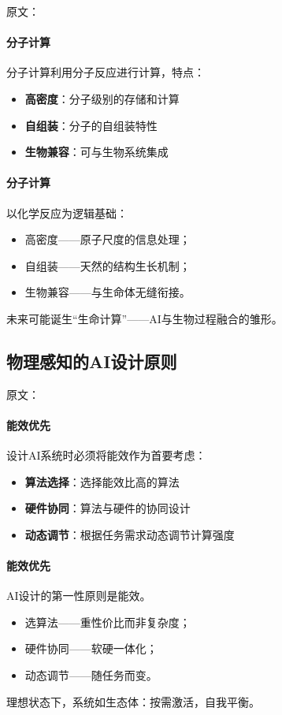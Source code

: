 原文：
\paragraph{分子计算}
分子计算利用分子反应进行计算，特点：
\begin{itemize}
\item \textbf{高密度}：分子级别的存储和计算
\item \textbf{自组装}：分子的自组装特性
\item \textbf{生物兼容}：可与生物系统集成
\end{itemize}
\paragraph{分子计算}
以化学反应为逻辑基础：
\begin{itemize}
\item 高密度——原子尺度的信息处理；
\item 自组装——天然的结构生长机制；
\item 生物兼容——与生命体无缝衔接。
\end{itemize}
未来可能诞生“生命计算”——AI与生物过程融合的雏形。

\subsection{物理感知的AI设计原则}

原文：
\paragraph{能效优先}
设计AI系统时必须将能效作为首要考虑：
\begin{itemize}
\item \textbf{算法选择}：选择能效比高的算法
\item \textbf{硬件协同}：算法与硬件的协同设计
\item \textbf{动态调节}：根据任务需求动态调节计算强度
\end{itemize}
\paragraph{能效优先}
AI设计的第一性原则是能效。  
\begin{itemize}
\item 选算法——重性价比而非复杂度；
\item 硬件协同——软硬一体化；
\item 动态调节——随任务而变。
\end{itemize}
理想状态下，系统如生态体：按需激活，自我平衡。

